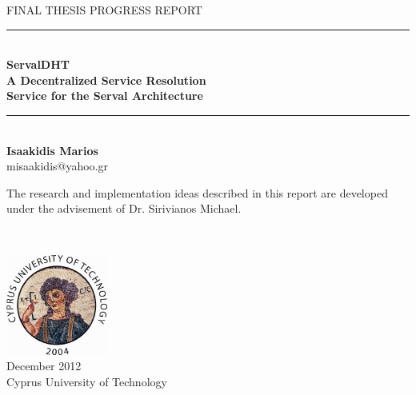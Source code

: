 \begin{titlepage}

\begin{center}

\newcommand{\HRule}{\rule{\linewidth}{0.5mm}}

\textsc{\large FINAL THESIS PROGRESS REPORT}\\[1.5cm]


\HRule \\[0.5cm]
{ \LARGE \bfseries {\huge ServalDHT} \\[0.2cm] A Decentralized Service Resolution\\[0.2cm]Service for the Serval Architecture}\\[0.5cm]

\HRule \\[1cm]

{\LARGE \bf
Isaakidis Marios\\
}
misaakidis@yahoo.gr

\vfill

{\large
The research and implementation ideas described in this report are developed under the advisement of Dr. Sirivianos Michael.}
\end{center}
 ~\\[1.5cm]
\begin{flushright}
\includegraphics[width=0.25\textwidth]{./cut-logo-2}\\ 
{\large
December 2012 \\
Cyprus University of Technology
}
\end{flushright}



\end{titlepage}